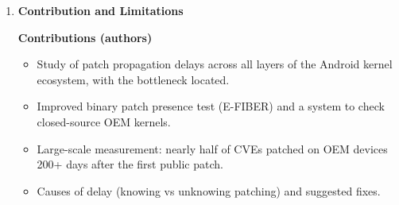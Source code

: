 \documentclass[11pt,a4paper]{article}
\newcommand{\entrypart}[1]{\textbf{\color{accent}#1}\par\vspace{2pt}}
\begin{document}
\begin{enumerate}
\begin{itemize}
\begin{itemize}
            \item Redmi 4: firmware updates until March 2019, but no security patches since early 2018.
        \end{itemize}
        \item \textbf{Causes}
        \begin{itemize}
            \item \textbf{Lack of knowledge:} Linux does not label security fixes. 17 of 37 critical patches initially missed by LTS.
            \item \textbf{Google:} merges from LTS. Bulletin publication takes 100 to 500 days for most CVEs, 500+ for 20\%. Faster when Google knowingly cherry-picks. Pipeline does not prioritize by severity.
            \item \textbf{Qualcomm stable:} cherry-pick only. Linux patches often added only when customers ask. Own bulletin delay: median 63 days, mean 130 days.
            \item \textbf{OEMs:} cherry-pick and fork at OS upgrade. 30\% -- 75\% of CVEs patched through forking. 80\% of Qualcomm CVEs take 100+ days after notification. Over 50\% patched within a month after Google's bulletin.
        \end{itemize}
        \item \textbf{Case study (CVE-2019-2215):} fixed in Linux mainline 2/1/2018. Android common cherry-picked it 2/6/2018. Bulletin only 10/5/2019 (18 months). Qualcomm Oreo stable branch never patched (end of life 1/22/2020). Samsung S8 got it only by forking the Pie branch.
        \item \textbf{Carrier delay:} small sample (T-Mobile, AT\&T), about 20 days from build to release.
        \item \textbf{Recommendations:} automated security triage, faster knowledge sharing, separate downstream customization so merges can be automatic.
    \end{itemize}

    \item \entrypart{Contribution and Limitations}

    \textbf{Contributions (authors)}
    \begin{itemize}
        \item Study of patch propagation delays across all layers of the Android kernel ecosystem, with the bottleneck located.
        \item Improved binary patch presence test (E-FIBER) and a system to check closed-source OEM kernels.
        \item Large-scale measurement: nearly half of CVEs patched on OEM devices 200+ days after the first public patch.
        \item Causes of delay (knowing vs unknowing patching) and suggested fixes.
    \end{itemize}


\end{enumerate}
\end{document}

